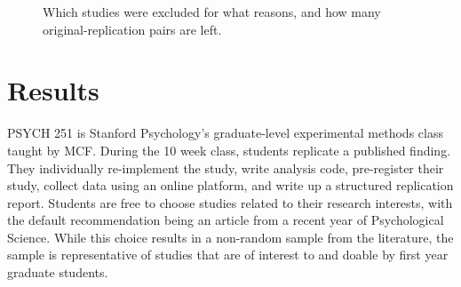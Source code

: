\documentclass[
  english,
  a4paper,
]{article}
\begin{document}
\begin{figure}[ht]
    
\caption{Which studies were excluded for what reasons, and how many original-replication pairs are left.}\label{fig:prisma}
\end{figure}

\hypertarget{results}{%
\section{Results}\label{results}}

PSYCH 251 is Stanford Psychology's graduate-level experimental methods class taught by MCF. During the 10 week class, students replicate a published finding. They individually re-implement the study, write analysis code, pre-register their study, collect data using an online platform, and write up a structured replication report. Students are free to choose studies related to their research interests, with the default recommendation being an article from a recent year of Psychological Science. While this choice results in a non-random sample from the literature, the sample is representative of studies that are of interest to and doable by first year graduate students.
\end{document}
